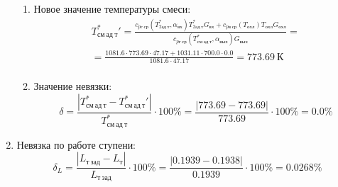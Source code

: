 \documentclass[a4paper,12pt]{article}
\begin{document}
\begin{enumerate}
\begin{enumerate}
            \item Новое значение температуры смеси:
            \begin{gather*}
                T_{см\ ад\ т}^*\prime = \frac{
                        c_{pг\ ср} (T_{2ад\ т}^*, \alpha_{вх}) T_{2ад\ т}^* G_{вх} + c_{pв\ ср} (T_{охл}) T_{охл} G_{охл}
                    }{
                        c_{pг\ ср} (T_{см\ ад\ т}^{*}, \alpha_{вых}) G_{вых}
                    } =\\
                = \frac{
                    1081.6
                    \cdot 773.69 \cdot 47.17 +
                    1031.11
                    \cdot 700.0 \cdot 0.0
                }{
                    1081.6
                    \cdot  47.17
                } =
                773.69\ К\\
            \end{gather*}

            \item Значение невязки:
            \[
                \delta = \frac{ \left| T_{см\ ад\ т}^{*} - T_{см\ ад\ т}^*\prime \right| }{T_{см\ ад\ т}^{*}} \cdot 100 \% =
                    \frac{
                        \left| 773.69 - 773.69 \right|
                    }{
                        773.69
                    } \cdot 100 \% =
                0.0 \%
            \]
        \end{enumerate}

        

        \item Невязка по работе ступени:
        \[
            \delta_L = \frac{ \left| L_{т\ зад} - L_т \right| }{ L_{т\ зад} } \cdot 100 \% =
                \frac{
                    \left| 0.1939 - 0.1938 \right|
                }{
                    0.1939 } \cdot 100 \% =
            0.0268 \%
        \]

    \end{enumerate}
     
\end{document}
